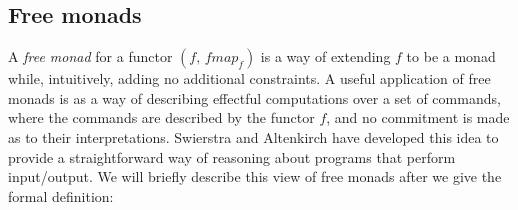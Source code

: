 \documentclass{jfp1}
\begin{document}





\subsection{Free monads}
\label{sec:free-monads}

A \emph{free monad} for a functor $(f,\, \mathit{fmap}_f)$ is a way of
extending $f$ to be a monad while, intuitively, adding no additional
constraints. A useful application of free monads is as a way of
describing effectful computations over a set of commands, where the
commands are described by the functor $f$, and no commitment is made
as to their interpretations. Swierstra and Altenkirch
\cite{swierstra07beauty} have developed this idea to provide a
straightforward way of reasoning about programs that perform
input/output. We will briefly describe this view of free monads after
we give the formal definition:
\end{document}
